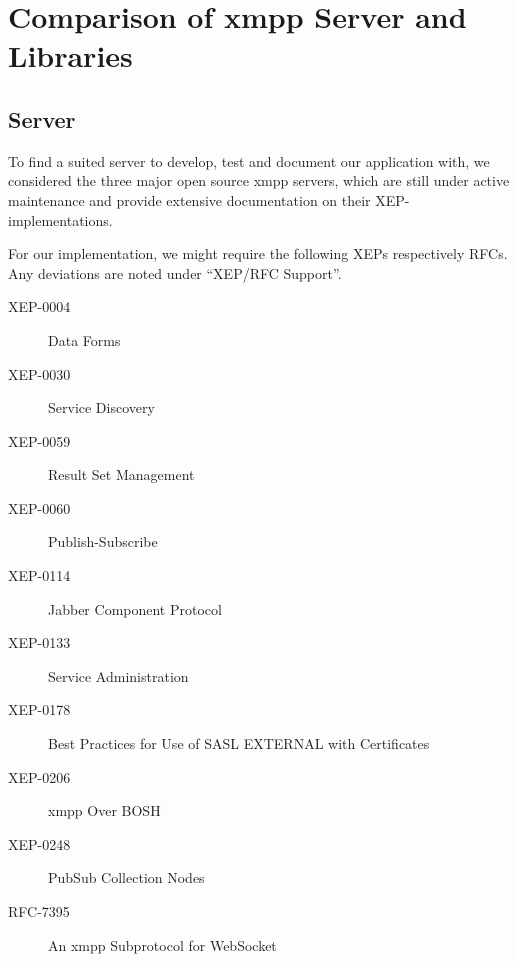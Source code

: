 \section{Comparison of \gls{xmpp} Server and Libraries}\label{sec:comparison-of-xmpp-server-and-libraries}


\subsection{Server}

To find a suited server to develop, test and document our application with, we considered the three major open source \gls{xmpp} servers, which are still under active maintenance and provide extensive documentation on their XEP-implementations.

For our implementation, we might require the following XEPs respectively RFCs. Any deviations are noted under ``XEP/RFC Support''.

\begin{description}
    \item[XEP-0004] Data Forms
    \item[XEP-0030] Service Discovery
    \item[XEP-0059] Result Set Management
    \item[XEP-0060] Publish-Subscribe
    \item[XEP-0114] Jabber Component Protocol
    \item[XEP-0133] Service Administration
    \item[XEP-0178] Best Practices for Use of SASL EXTERNAL with Certificates
    \item[XEP-0206] \gls{xmpp} Over BOSH
    \item[XEP-0248] PubSub Collection Nodes
    \item[RFC-7395] An \gls{xmpp} Subprotocol for WebSocket
\end{description}

